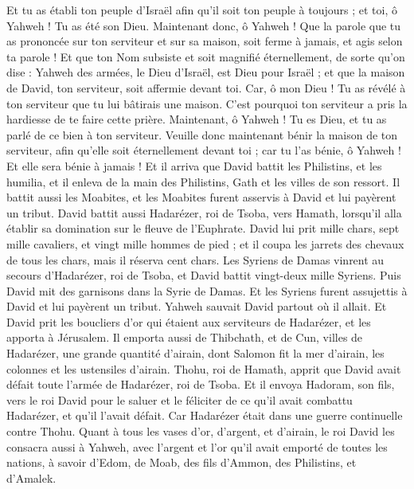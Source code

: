 \begin{multicols}{2}
Et tu as établi ton peuple d'Israël afin qu'il soit ton peuple à toujours ; et toi, ô Yahweh ! Tu as été son Dieu.
Maintenant donc, ô Yahweh ! Que la parole que tu as prononcée sur ton serviteur et sur sa maison, soit ferme à jamais, et agis selon ta parole !
Et que ton Nom subsiste et soit magnifié éternellement, de sorte qu'on dise : Yahweh des armées, le Dieu d'Israël, est Dieu pour Israël ; et que la maison de David, ton serviteur, soit affermie devant toi.
Car, ô mon Dieu ! Tu as révélé à ton serviteur que tu lui bâtirais une maison. C'est pourquoi ton serviteur a pris la hardiesse de te faire cette prière.
Maintenant, ô Yahweh ! Tu es Dieu, et tu as parlé de ce bien à ton serviteur.
Veuille donc maintenant bénir la maison de ton serviteur, afin qu'elle soit éternellement devant toi ; car tu l'as bénie, ô Yahweh ! Et elle sera bénie à jamais !
\VerseOne{}Et il arriva que David battit les Philistins, et les humilia, et il enleva de la main des Philistins, Gath et les villes de son ressort.
Il battit aussi les Moabites, et les Moabites furent asservis à David et lui payèrent un tribut.
David battit aussi Hadarézer, roi de Tsoba, vers Hamath, lorsqu'il alla établir sa domination sur le fleuve de l'Euphrate.
David lui prit mille chars, sept mille cavaliers, et vingt mille hommes de pied ; et il coupa les jarrets des chevaux de tous les chars, mais il réserva cent chars.
Les Syriens de Damas vinrent au secours d'Hadarézer, roi de Tsoba, et David battit vingt-deux mille Syriens.
Puis David mit des garnisons dans la Syrie de Damas. Et les Syriens furent assujettis à David et lui payèrent un tribut. Yahweh sauvait David partout où il allait.
Et David prit les boucliers d'or qui étaient aux serviteurs de Hadarézer, et les apporta à Jérusalem.
Il emporta aussi de Thibchath, et de Cun, villes de Hadarézer, une grande quantité d'airain, dont Salomon fit la mer d'airain, les colonnes et les ustensiles d'airain.
Thohu, roi de Hamath, apprit que David avait défait toute l'armée de Hadarézer, roi de Tsoba.
Et il envoya Hadoram, son fils, vers le roi David pour le saluer et le féliciter de ce qu'il avait combattu Hadarézer, et qu'il l'avait défait. Car Hadarézer était dans une guerre continuelle contre Thohu. Quant à tous les vases d'or, d'argent, et d'airain,
le roi David les consacra aussi à Yahweh, avec l'argent et l'or qu'il avait emporté de toutes les nations, à savoir d'Edom, de Moab, des fils d'Ammon, des Philistins, et d'Amalek.

\end{multicols}
